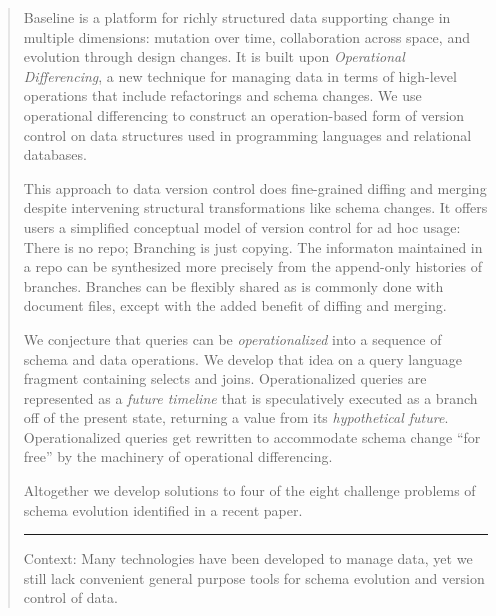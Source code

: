 \documentclass[english,submission]{programming}
\theoremstyle{definition}
\begin{document}
\maketitle

\begin{abstract}

  Baseline is a platform for richly structured data supporting change in multiple dimensions: mutation over time, collaboration across space, and evolution through design changes. It is built upon \textit{Operational Differencing}, a new technique for managing data in terms of high-level operations that include refactorings and schema changes. We use operational differencing to construct an operation-based form of version control on data structures used in programming languages and relational databases.

  This approach to data version control does fine-grained diffing and merging despite intervening structural transformations like schema changes. It offers users a simplified conceptual model of version control for ad hoc usage: There is no repo; Branching is just copying. The informaton maintained in a repo can be synthesized more precisely from the append-only histories of branches. Branches can be flexibly shared as is commonly done with document files, except with the added benefit of diffing and merging.

  We conjecture that queries can be \textit{operationalized} into a sequence of schema and data operations. We develop that idea on a query language fragment containing selects and joins.
  Operationalized queries are represented as a \textit{future timeline} that is speculatively executed as a branch off of the present state, returning a value from its \textit{hypothetical future}. Operationalized queries get rewritten to accommodate schema change ``for free'' by the machinery of operational differencing.

  Altogether we develop solutions to four of the eight challenge problems of schema evolution identified in a recent paper.

\noindent\rule{\textwidth}{1pt}

Context: Many technologies have been developed to manage data, yet we still lack convenient general purpose tools for schema evolution and version control of data.


\end{abstract}
\end{document}
